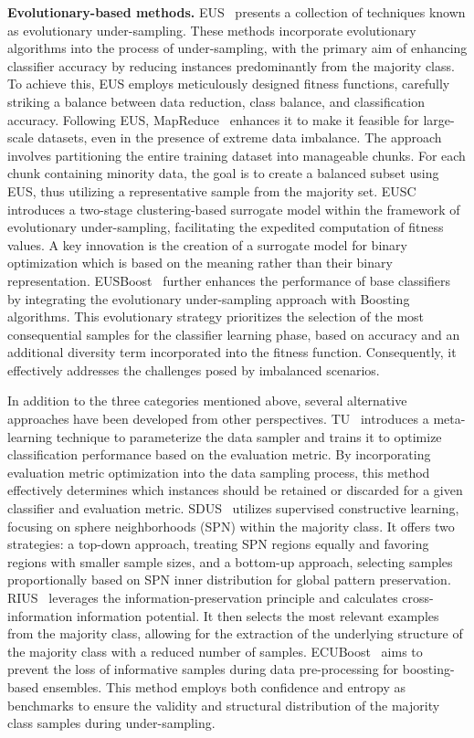 \textbf{Evolutionary-based methods.}
EUS~\cite{garcia2009evolutionary} presents a collection of techniques known as evolutionary under-sampling. These methods incorporate evolutionary algorithms into the process of under-sampling, with the primary aim of enhancing classifier accuracy by reducing instances predominantly from the majority class. To achieve this, EUS employs meticulously designed fitness functions, carefully striking a balance between data reduction, class balance, and classification accuracy.
Following EUS, MapReduce~\cite{triguero2015evolutionary} enhances it to make it feasible for large-scale datasets, even in the presence of extreme data imbalance. The approach involves partitioning the entire training dataset into manageable chunks. For each chunk containing minority data, the goal is to create a balanced subset using EUS, thus utilizing a representative sample from the majority set.
EUSC~\cite{le2021eusc} introduces a two-stage clustering-based surrogate model within the framework of evolutionary under-sampling, facilitating the expedited computation of fitness values. A key innovation is the creation of a surrogate model for binary optimization which is based on the meaning rather than their binary representation.
EUSBoost~\cite{galar2013eusboost, krawczyk2016evolutionary} further enhances the performance of base classifiers by integrating the evolutionary under-sampling approach with Boosting algorithms. This evolutionary strategy prioritizes the selection of the most consequential samples for the classifier learning phase, based on accuracy and an additional diversity term incorporated into the fitness function. Consequently, it effectively addresses the challenges posed by imbalanced scenarios.


In addition to the three categories mentioned above, several alternative approaches have been developed from other perspectives. 
TU~\cite{peng2019trainable} introduces a meta-learning technique to parameterize the data sampler and trains it to optimize classification performance based on the evaluation metric. By incorporating evaluation metric optimization into the data sampling process, this method effectively determines which instances should be retained or discarded for a given classifier and evaluation metric.
SDUS~\cite{9741366} utilizes supervised constructive learning, focusing on sphere neighborhoods (SPN) within the majority class. It offers two strategies: a top-down approach, treating SPN regions equally and favoring regions with smaller sample sizes, and a bottom-up approach, selecting samples proportionally based on SPN inner distribution for global pattern preservation.
RIUS~\cite{hoyos2021relevant} leverages the information-preservation principle and calculates cross-information information potential. It then selects the most relevant examples from the majority class, allowing for the extraction of the underlying structure of the majority class with a reduced number of samples.
ECUBoost~\cite{8968753} aims to prevent the loss of informative samples during data pre-processing for boosting-based ensembles. This method employs both confidence and entropy as benchmarks to ensure the validity and structural distribution of the majority class samples during under-sampling.




